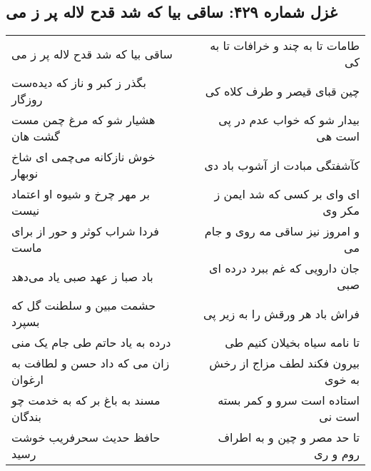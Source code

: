 \begin{center}
\section*{غزل شماره ۴۲۹: ساقی بیا که شد قدح لاله پر ز می}
\label{sec:sh429}
\begin{longtable}{l p{0.5cm} r}
ساقی بیا که شد قدح لاله پر ز می
&&
طامات تا به چند و خرافات تا به کی
\\
بگذر ز کبر و ناز که دیده‌ست روزگار
&&
چین قبای قیصر و طرف کلاه کی
\\
هشیار شو که مرغ چمن مست گشت هان
&&
بیدار شو که خواب عدم در پی است هی
\\
خوش نازکانه می‌چمی ای شاخ نوبهار
&&
کآشفتگی مبادت از آشوب باد دی
\\
بر مهر چرخ و شیوه او اعتماد نیست
&&
ای وای بر کسی که شد ایمن ز مکر وی
\\
فردا شراب کوثر و حور از برای ماست
&&
و امروز نیز ساقی مه روی و جام می
\\
باد صبا ز عهد صبی یاد می‌دهد
&&
جان دارویی که غم ببرد درده ای صبی
\\
حشمت مبین و سلطنت گل که بسپرد
&&
فراش باد هر ورقش را به زیر پی
\\
درده به یاد حاتم طی جام یک منی
&&
تا نامه سیاه بخیلان کنیم طی
\\
زان می که داد حسن و لطافت به ارغوان
&&
بیرون فکند لطف مزاج از رخش به خوی
\\
مسند به باغ بر که به خدمت چو بندگان
&&
استاده است سرو و کمر بسته است نی
\\
حافظ حدیث سحرفریب خوشت رسید
&&
تا حد مصر و چین و به اطراف روم و ری
\\
\end{longtable}
\end{center}
